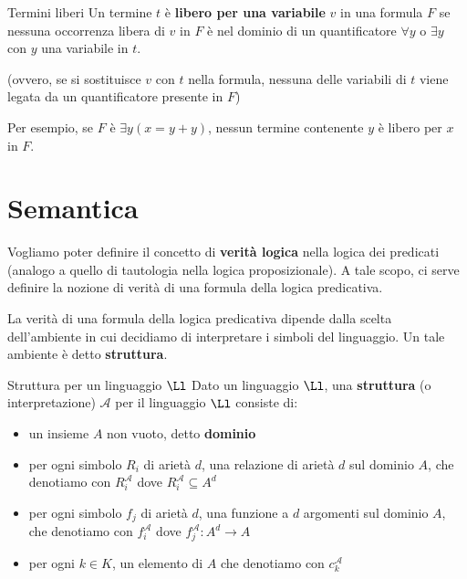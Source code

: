 \documentclass[a4paper,11pt]{report}
\newcommand{\Ra}{R^{\mathcal{A}}}
\newcommand{\fa}{f^{\mathcal{A}}}
\newcommand{\ca}{c^{\mathcal{A}}}
\begin{document}
\begin{defframe}{Termini liberi}{}
    \label{terlib}
    Un termine \( t \) è \textbf{libero per una variabile} \( v \) in una formula \( F \) se nessuna occorrenza libera di \( v \) in \( F \) è nel dominio di un quantificatore \( \forall y \) o \( \exists y \) con \( y \) una variabile in \( t\).

    (ovvero, se si sostituisce \( v \) con \( t \) nella formula, nessuna delle variabili di \( t \) viene legata da un quantificatore presente in \( F \))
\end{defframe}

Per esempio, se \( F \) è \( \exists y (x = y + y) \), nessun termine contenente \( y \) è libero per \( x \) in \( F \).


\section{Semantica}
Vogliamo poter definire il concetto di \textbf{verità logica} nella logica dei predicati (analogo a quello di tautologia nella logica proposizionale). A tale scopo, ci serve definire la nozione di verità di una formula della logica predicativa.

La verità di una formula della logica predicativa dipende dalla scelta dell'ambiente in cui decidiamo di interpretare i simboli del linguaggio. Un tale ambiente è detto \textbf{struttura}.

\begin{defframe}{Struttura per un linguaggio \( \Ll \)}{}
    Dato un linguaggio \( \Ll\), una \textbf{struttura} (o interpretazione) \(\mathcal{A}\) per il linguaggio \( \Ll \) consiste di:
    \begin{itemize}
        \item un insieme \( A \) non vuoto, detto \textbf{dominio}
        \item per ogni simbolo \( R_i \) di arietà \( d \), una relazione di arietà \( d \) sul dominio \( A \), che denotiamo con \(\Ra_i \) dove \( \Ra_i \subseteq A^d \)
        \item per ogni simbolo \( f_j \) di arietà \( d \), una funzione a \( d \) argomenti sul dominio \( A \), che denotiamo con \(\fa_i \) dove \( \fa_j : A^d \to A \)
        \item per ogni \( k \in K \), un elemento di \( A \) che denotiamo con \( \ca_k\)
    \end{itemize}
    
\end{defframe}
\end{document}
